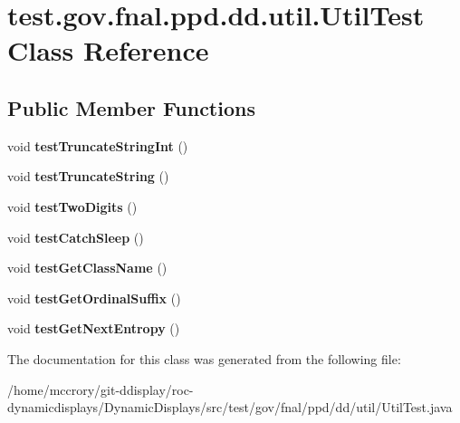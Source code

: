 \hypertarget{classtest_1_1gov_1_1fnal_1_1ppd_1_1dd_1_1util_1_1UtilTest}{\section{test.\-gov.\-fnal.\-ppd.\-dd.\-util.\-Util\-Test Class Reference}
\label{classtest_1_1gov_1_1fnal_1_1ppd_1_1dd_1_1util_1_1UtilTest}
}
\subsection*{Public Member Functions}
\begin{DoxyCompactItemize}
\item 
\hypertarget{classtest_1_1gov_1_1fnal_1_1ppd_1_1dd_1_1util_1_1UtilTest_ab96943ae8a566fd4b7a0e898a7cd7d43}{void {\bfseries test\-Truncate\-String\-Int} ()}\label{classtest_1_1gov_1_1fnal_1_1ppd_1_1dd_1_1util_1_1UtilTest_ab96943ae8a566fd4b7a0e898a7cd7d43}

\item 
\hypertarget{classtest_1_1gov_1_1fnal_1_1ppd_1_1dd_1_1util_1_1UtilTest_a0230d77afa30735fb3f9ae40dc3e58fb}{void {\bfseries test\-Truncate\-String} ()}\label{classtest_1_1gov_1_1fnal_1_1ppd_1_1dd_1_1util_1_1UtilTest_a0230d77afa30735fb3f9ae40dc3e58fb}

\item 
\hypertarget{classtest_1_1gov_1_1fnal_1_1ppd_1_1dd_1_1util_1_1UtilTest_a7cf05597cbf29ca2f49f8acb84aca276}{void {\bfseries test\-Two\-Digits} ()}\label{classtest_1_1gov_1_1fnal_1_1ppd_1_1dd_1_1util_1_1UtilTest_a7cf05597cbf29ca2f49f8acb84aca276}

\item 
\hypertarget{classtest_1_1gov_1_1fnal_1_1ppd_1_1dd_1_1util_1_1UtilTest_ae7e701f1f7c699e905e7fe6fde2f8969}{void {\bfseries test\-Catch\-Sleep} ()}\label{classtest_1_1gov_1_1fnal_1_1ppd_1_1dd_1_1util_1_1UtilTest_ae7e701f1f7c699e905e7fe6fde2f8969}

\item 
\hypertarget{classtest_1_1gov_1_1fnal_1_1ppd_1_1dd_1_1util_1_1UtilTest_a824964e9a30eb87959166de898644c34}{void {\bfseries test\-Get\-Class\-Name} ()}\label{classtest_1_1gov_1_1fnal_1_1ppd_1_1dd_1_1util_1_1UtilTest_a824964e9a30eb87959166de898644c34}

\item 
\hypertarget{classtest_1_1gov_1_1fnal_1_1ppd_1_1dd_1_1util_1_1UtilTest_a488770a4b8fad085ef14f836b3421b80}{void {\bfseries test\-Get\-Ordinal\-Suffix} ()}\label{classtest_1_1gov_1_1fnal_1_1ppd_1_1dd_1_1util_1_1UtilTest_a488770a4b8fad085ef14f836b3421b80}

\item 
\hypertarget{classtest_1_1gov_1_1fnal_1_1ppd_1_1dd_1_1util_1_1UtilTest_a59dcf291281cba49a63d64423941b303}{void {\bfseries test\-Get\-Next\-Entropy} ()}\label{classtest_1_1gov_1_1fnal_1_1ppd_1_1dd_1_1util_1_1UtilTest_a59dcf291281cba49a63d64423941b303}

\end{DoxyCompactItemize}


The documentation for this class was generated from the following file\-:\begin{DoxyCompactItemize}
\item 
/home/mccrory/git-\/ddisplay/roc-\/dynamicdisplays/\-Dynamic\-Displays/src/test/gov/fnal/ppd/dd/util/Util\-Test.\-java\end{DoxyCompactItemize}
